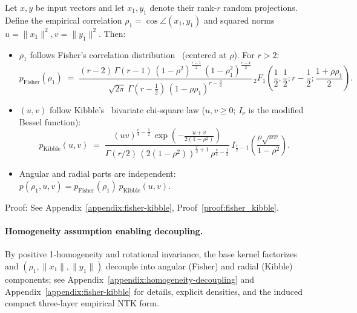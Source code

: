 \begin{lemma}\label{lem:fisher-kibble}
Let \(x,y\) be input vectors and let \(x_1,y_1\) denote their rank-\(r\) random projections. Define the empirical correlation \( \rho_1 = \cos\angle(x_1,y_1) \) and squared norms \( u=\|x_1\|^2, v=\|y_1\|^2 \). Then:
\begin{itemize}
    \item \( \rho_1 \) follows Fisher's correlation distribution~\cite{fisher1915probable,hotelling1953new} (centered at \( \rho \)). For \(r>2\):
    \[
    p_{\mathrm{Fisher}}(\rho_1)
    \;=\;
    \frac{(r-2)\,\Gamma(r-1)\,(1-\rho^2)^{\frac{r-1}{2}}\,(1-\rho_1^2)^{\frac{r-4}{2}}}{\sqrt{2\pi}\,\Gamma(r-\frac{1}{2})\,(1-\rho\rho_1)^{r-\frac{3}{2}}}\,
    {}_2F_1\!\left(\frac{1}{2},\frac{1}{2}; r-\frac{1}{2}; \frac{1+\rho\rho_1}{2}\right).
    \]

    \item \( (u,v) \) follow Kibble's~\cite{kibble1941two} bivariate chi-square law (\(u,v\ge 0\); \(I_\nu\) is the modified Bessel function):
    \[
    p_{\mathrm{Kibble}}(u,v)
    \;=\;
    \frac{(uv)^{\frac{r}{4}-\frac{1}{2}}\,\exp\!\left(-\frac{u+v}{2(1-\rho^2)}\right)}{\Gamma(r/2)\,(2(1-\rho^2))^{\frac{r}{2}+1}\,\rho^{\frac{r}{4}-\frac{1}{2}}}\,
    I_{\frac{r}{2}-1}\!\left(\frac{\rho\sqrt{uv}}{1-\rho^2}\right).
    \]

    \item Angular and radial parts are independent: \( p(\rho_1,u,v) = p_{\mathrm{Fisher}}(\rho_1)\,p_{\mathrm{Kibble}}(u,v) \).
\end{itemize}
\end{lemma}

Proof: See Appendix~\ref{appendix:fisher-kibble}, Proof~\ref{proof:fisher_kibble}.

\paragraph{Homogeneity assumption enabling decoupling.}
By positive 1-homogeneity and rotational invariance, the base kernel factorizes and \((\rho_1,\|x_1\|,\|y_1\|)\) decouple into angular (Fisher) and radial (Kibble) components; see Appendix~\ref{appendix:homogeneity-decoupling} and Appendix~\ref{appendix:fisher-kibble} for details, explicit densities, and the induced compact three-layer empirical NTK form.

